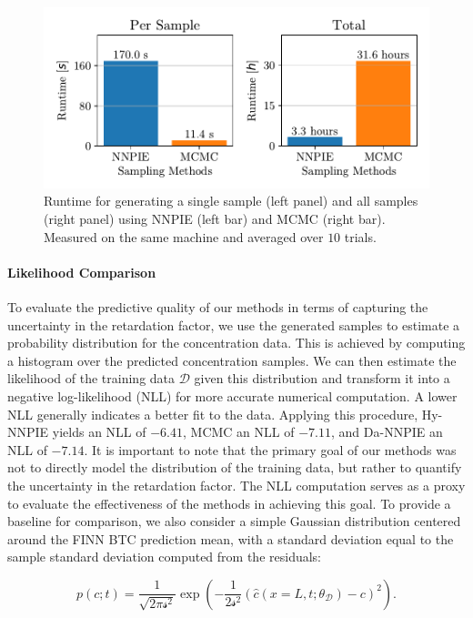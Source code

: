 \begin{figure}[h]
    \centering
    \includegraphics{figs/runtime_comparison.pdf}
    \caption{Runtime for generating a single sample (left panel) and all samples (right panel) using NNPIE (left bar) and MCMC (right bar). Measured on the same machine and averaged over $10$ trials.}
    \label{fig:runtime_comparison}
\end{figure}



\paragraph{Likelihood Comparison}
\label{sec:likelihood}
To evaluate the predictive quality of our methods in terms of capturing the uncertainty in the retardation factor, we use the generated samples to estimate a probability distribution for the concentration data. This is achieved by computing a histogram over the predicted concentration samples. We can then estimate the likelihood of the training data $\mathcal{D}$ given this distribution and transform it into a negative log-likelihood (NLL) for more accurate numerical computation. A lower NLL generally indicates a better fit to the data. Applying this procedure, Hy-NNPIE yields an NLL of $-6.41$, MCMC an NLL of $-7.11$, and Da-NNPIE an NLL of $-7.14$. It is important to note that the primary goal of our methods was not to directly model the distribution of the training data, but rather to quantify the uncertainty in the retardation factor. The NLL computation serves as a proxy to evaluate the effectiveness of the methods in achieving this goal. To provide a baseline for comparison, we also consider a simple Gaussian distribution centered around the FINN BTC prediction mean, with a standard deviation equal to the sample standard deviation computed from the residuals:

\begin{equation*}
    p(c; t) = \frac{1}{\sqrt{2 \pi \mathcal{s}^2}} \exp(-\frac{1}{2 \mathcal{s}^2} (\hat{c}(x=L, t;\theta_{\mathcal{D}}) - c)^2) .
\end{equation*}

